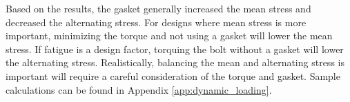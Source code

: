 Based on the results, the gasket generally increased the mean stress and decreased the alternating stress. For designs where mean stress is more important, minimizing the torque and not using a gasket will lower the mean stress. If fatigue is a design factor, torquing the bolt without a gasket will lower the alternating stress. Realistically, balancing the mean and alternating stress is important will require a careful consideration of the torque and gasket. Sample calculations can be found in Appendix \ref{app:dynamic_loading}.